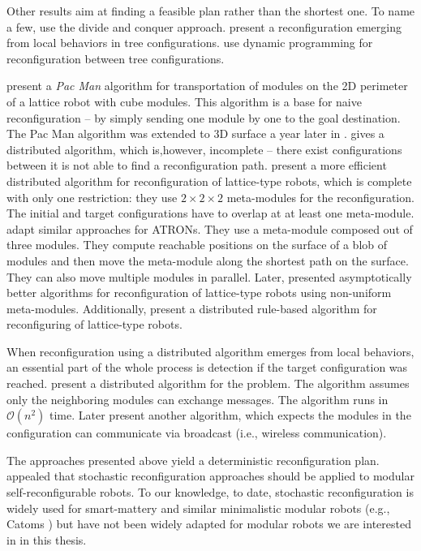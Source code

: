 Other results aim at finding a feasible plan rather than the shortest one. To
name a few, \textcite{10.1117/12.360345} use the divide and conquer approach.
\textcite{DBLP:conf/icra/HouS08} present a reconfiguration emerging from local
behaviors in tree configurations. \textcite{DBLP:journals/ral/LiuWY19} use
dynamic programming for reconfiguration between tree configurations.

\textcite{DBLP:conf/iros/ButlerBR01} present a \emph{Pac Man} algorithm for
transportation of modules on the 2D perimeter of a lattice robot with cube
modules. This algorithm is a base for naive reconfiguration -- by simply sending
one module by one to the goal destination. The Pac Man algorithm was extended to
3D surface a year later in \cite{DBLP:conf/wafr/ButlerR02}.
\textcite{DBLP:journals/dc/WalterWA00} gives a distributed algorithm, which
is,however, incomplete -- there exist configurations between it is not able to
find a reconfiguration path. \textcite{DBLP:conf/icra/VassilvitskiiYS02} present
a more efficient distributed algorithm for reconfiguration of lattice-type
robots, which is complete with only one restriction: they use $2\times2\times2$
meta-modules for the reconfiguration. The initial and target configurations have
to overlap at at least one meta-module.
\textcite{DBLP:conf/ieeealife/Christensen07} adapt similar approaches for
ATRONs. They use a meta-module composed out of three modules. They compute
reachable positions on the surface of a blob of modules and then move the
meta-module along the shortest path on the surface. They can also move multiple
modules in parallel. Later, \textcite{DBLP:journals/comgeo/AloupisBDDFIW13}
presented asymptotically better algorithms for reconfiguration of lattice-type
robots using non-uniform meta-modules. Additionally,
\textcite{DBLP:conf/pdp/PirandaB16} present a distributed rule-based algorithm
for reconfiguring of lattice-type robots.

When reconfiguration using a distributed algorithm emerges from local behaviors,
an essential part of the whole process is detection if the target configuration
was reached. \textcite{DBLP:conf/icra/ButlerFRW02} present a distributed
algorithm for the problem. The algorithm assumes only the neighboring modules
can exchange messages. The algorithm runs in $\mathcal{O}(n^2)$ time. Later
\textcite{DBLP:journals/ras/BacaWDN17} present another algorithm, which expects
the modules in the configuration can communicate via broadcast (i.e., wireless
communication).

The approaches presented above yield a deterministic reconfiguration plan.
\textcite{4141032} appealed that stochastic reconfiguration approaches should be
applied to modular self-reconfigurable robots. To our knowledge, to date,
stochastic reconfiguration is widely used for smart-mattery and similar
minimalistic modular robots (e.g., Catoms \cite{DBLP:conf/aaai/KirbyCAPHMG05})
but have not been widely adapted for  modular robots we are
interested in in this thesis.

